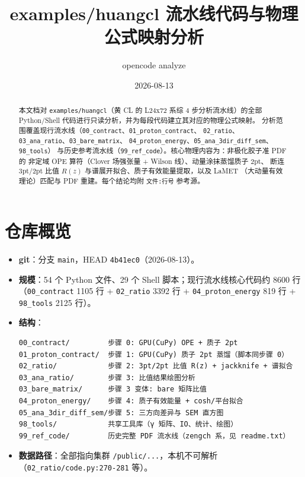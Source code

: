 \documentclass[UTF8]{ctexart}
\title{examples/huangcl 流水线代码与物理公式映射分析}
\author{opencode analyze}
\date{2026-08-13}
\begin{document}
\maketitle

\begin{abstract}
本文档对 \texttt{examples/huangcl}（黄 CL 的 L24x72 系综 4 步分析流水线）的全部
Python/Shell 代码进行只读分析，并为每段代码建立其对应的物理公式映射。
分析范围覆盖现行流水线（\texttt{00\_contract}、\texttt{01\_proton\_contract}、
\texttt{02\_ratio}、\texttt{03\_ana\_ratio}、\texttt{03\_bare\_matrix}、
\texttt{04\_proton\_energy}、\texttt{05\_ana\_3dir\_diff\_sem}、\texttt{98\_tools}）
与历史参考流水线（\texttt{99\_ref\_code}）。核心物理内容为：非极化胶子准 PDF 的
非定域 OPE 算符（Clover 场强张量 + Wilson 线）、动量涂抹蒸馏质子 2pt、
断连 3pt/2pt 比值 $R(z)$ 与谱展开拟合、质子有效能量提取，以及 LaMET
（大动量有效理论）匹配与 PDF 重建。每个结论均附 \texttt{文件:行号} 参考源。
\end{abstract}

\tableofcontents

\section{仓库概览}

\begin{itemize}
  \item \textbf{git}：分支 \texttt{main}，HEAD \texttt{4b41ec0}（2026-08-13）。
  \item \textbf{规模}：54 个 Python 文件、29 个 Shell 脚本；现行流水线核心代码约 8600 行
        （\texttt{00\_contract} 1105 行 + \texttt{02\_ratio} 3392 行 +
        \texttt{04\_proton\_energy} 819 行 + \texttt{98\_tools} 2125 行）。
  \item \textbf{结构}：
\begin{verbatim}
00_contract/         步骤 0: GPU(CuPy) OPE + 质子 2pt
01_proton_contract/  步骤 1: GPU(CuPy) 质子 2pt 蒸馏（脚本同步骤 0）
02_ratio/            步骤 2: 3pt/2pt 比值 R(z) + jackknife + 谱拟合
03_ana_ratio/        步骤 3: 比值结果绘图分析
03_bare_matrix/      步骤 3 变体: bare 矩阵比值
04_proton_energy/    步骤 4: 质子有效能量 + cosh/平台拟合
05_ana_3dir_diff_sem/步骤 5: 三方向差异与 SEM 直方图
98_tools/            共享工具库（γ 矩阵、IO、统计、绘图）
99_ref_code/         历史完整 PDF 流水线（zengch 系，见 readme.txt）
\end{verbatim}
  \item \textbf{数据路径}：全部指向集群 \texttt{/public/...}，本机不可解析
        （\texttt{02\_ratio/code.py:270-281} 等）。
\end{itemize}
\end{document}
